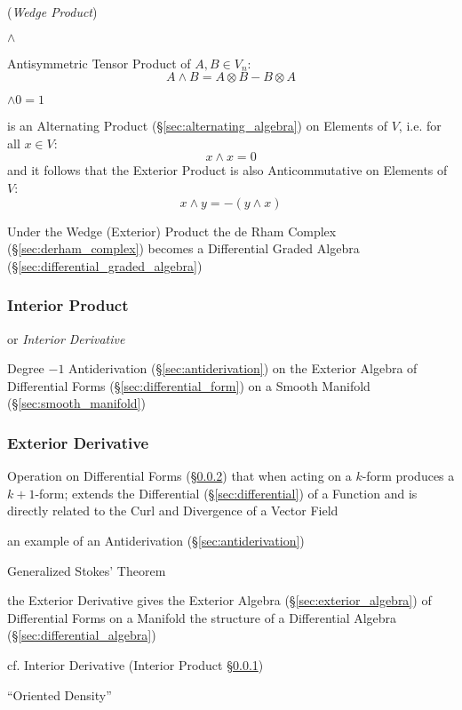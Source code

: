 {{(\emph{Wedge Product})

$\wedge$

Antisymmetric Tensor Product of $A, B \in V_n$:
\[
  A \wedge B = A \otimes B - B \otimes A
\]

$\wedge 0 = 1$

is an Alternating Product (\S\ref{sec:alternating_algebra}) on Elements of $V$,
i.e. for all $x \in V$:
\[
  x \wedge x = 0
\]
and it follows that the Exterior Product is also Anticommutative on Elements of
$V$:
\[
  x \wedge y = -(y \wedge x)
\]

Under the Wedge (Exterior) Product the de Rham Complex
(\S\ref{sec:derham_complex}) becomes a Differential Graded Algebra
(\S\ref{sec:differential_graded_algebra})



\subsubsection{Interior Product}\label{sec:interior_product}

or \emph{Interior Derivative}

Degree $-1$ Antiderivation (\S\ref{sec:antiderivation}) on the Exterior Algebra
of Differential Forms (\S\ref{sec:differential_form}) on a Smooth Manifold
(\S\ref{sec:smooth_manifold})




\subsubsection{Exterior Derivative}\label{sec:exterior_derivative}\hfill

Operation on Differential Forms (\S\ref{sec:exterior_derivative}) that when
acting on a $k$-form produces a $k+1$-form; extends the Differential
(\S\ref{sec:differential}) of a Function and is directly related to the Curl and
Divergence of a Vector Field

an example of an Antiderivation (\S\ref{sec:antiderivation})

Generalized Stokes' Theorem

the Exterior Derivative gives the Exterior Algebra
(\S\ref{sec:exterior_algebra}) of Differential Forms on a Manifold the structure
of a Differential Algebra (\S\ref{sec:differential_algebra})

\fist cf. Interior Derivative (Interior Product \S\ref{sec:interior_product})

``Oriented Density'' %

}}
